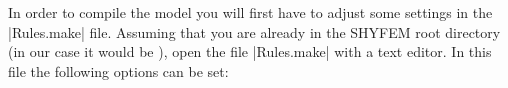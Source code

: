 
%
%
%
%
%
%
%

In order to compile the model you will first have to adjust some settings
in the |Rules.make| file. Assuming that you are already in the SHYFEM
root directory (in our case it would be \ttt{\shydir}), open the file
|Rules.make| with a text editor.  In this file the following options
can be set:

